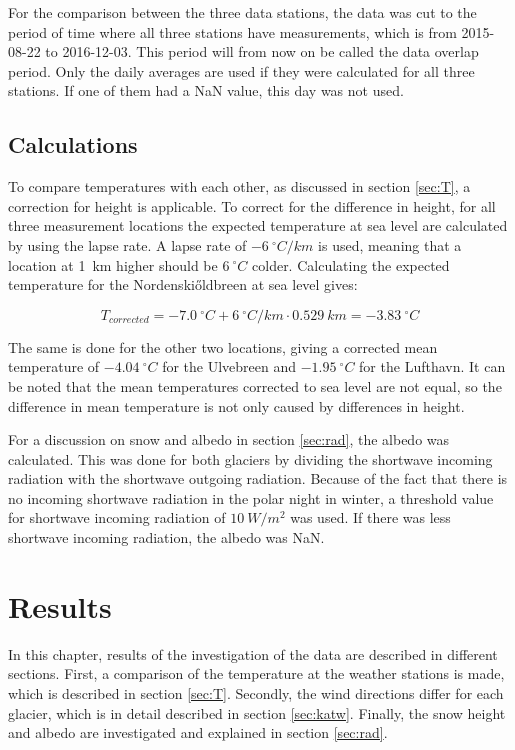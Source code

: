 \documentclass[11pt]{report}
\begin{document}
For the comparison between the three data stations, the data was cut to the period of time where all three stations have measurements, which is from 2015-08-22 to 2016-12-03. This period will from now on be called the data overlap period. Only the daily averages are used if they were calculated for all three stations. If one of them had a NaN value, this day was not used.

\section{Calculations}\label{sec:calc}
To compare temperatures with each other, as discussed in section \ref{sec:T}, a correction for height is applicable. To correct for the difference in height, for all three measurement locations the expected temperature at sea level are calculated by using the lapse rate. A lapse rate of $\SI{-6}{^{\circ}C/km}$ is used, meaning that a location at \SI{1}{km} higher should be $\SI{6}{^{\circ}C}$ colder.\cite{brzblak} Calculating the expected temperature for the Nordenski\H{o}ldbreen at sea level gives:

\begin{equation}
    T_{corrected} = \SI{-7.0}{^\circ C} + \SI{6}{^\circ C/km} \cdot \SI{0.529}{km} = \SI{-3.83}{^\circ C}
    \label{eq:Tatsl}
\end{equation}

The same is done for the other two locations, giving a corrected mean temperature of $\SI{-4.04}{^\circ C}$ for the Ulvebreen and $\SI{-1.95}{^\circ C}$ for the Lufthavn. It can be noted that the mean temperatures corrected to sea level are not equal, so the difference in mean temperature is not only caused by differences in height. 

For a discussion on snow and albedo in section \ref{sec:rad}, the albedo was calculated. This was done for both glaciers by dividing the shortwave incoming radiation with the shortwave outgoing radiation. Because of the fact that there is no incoming shortwave radiation in the polar night in winter, a threshold value for shortwave incoming radiation of $\SI{10}{W/m^2}$ was used. If there was less shortwave incoming radiation, the albedo was NaN. 


\newpage
\chapter{Results}\label{sec:results}
In this chapter, results of the investigation of the data are described in different sections. First, a comparison of the temperature at the weather stations is made, which is described in section \ref{sec:T}. Secondly, the wind directions differ for each glacier, which is in detail described in section \ref{sec:katw}. Finally, the snow height and albedo are investigated and explained in section \ref{sec:rad}.
\end{document}
